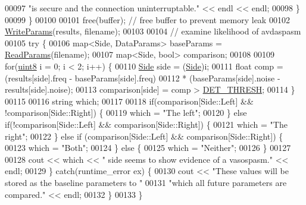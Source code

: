 \begin{DoxyCode}
00097                 \textcolor{stringliteral}{"is secure and the connection uninterruptable."} << endl << endl;
00098         \}
00099     \}
00100 
00101     free(buffer);  \textcolor{comment}{// free buffer to prevent memory leak}
00102     \hyperlink{namespaceavda_aba04a08b41833ced32ec803d55a63bee}{WriteParams}(results, filename);
00103 
00104     \textcolor{comment}{// examine likelihood of avdaspasm}
00105     \textcolor{keywordflow}{try} \{
00106         map<Side, DataParams> baseParams = \hyperlink{namespaceavda_a46dc980b65ddfc24749ce25c1290e158}{ReadParams}(filename);
00107         map<Side, bool> comparison;
00108 
00109         \textcolor{keywordflow}{for}(\hyperlink{definitions_8hpp_adde6aaee8457bee49c2a92621fe22b79}{uint8} i = 0; i < 2; i++) \{
00110             \hyperlink{namespaceavda_af723e82f0d3d45fda6fdc01f6a492786}{Side} side = (\hyperlink{namespaceavda_af723e82f0d3d45fda6fdc01f6a492786}{Side})i;
00111             \textcolor{keywordtype}{float} comp = (results[side].freq - baseParams[side].freq) 
00112                 * (baseParams[side].noise - results[side].noise);
00113             comparison[side] = comp > \hyperlink{definitions_8hpp_aa15adfcc96559f1b86210d217edd3afc}{DET\_THRESH};
00114         \}
00115 
00116         \textcolor{keywordtype}{string} which;
00117 
00118         \textcolor{keywordflow}{if}(comparison[Side::Left] && !comparison[Side::Right]) \{
00119             which = \textcolor{stringliteral}{"The left"};
00120         \} \textcolor{keywordflow}{else} \textcolor{keywordflow}{if}(!comparison[Side::Left] && comparison[Side::Right]) \{
00121             which = \textcolor{stringliteral}{"The right"};
00122         \} \textcolor{keywordflow}{else} \textcolor{keywordflow}{if} (comparison[Side::Left] && comparison[Side::Right]) \{
00123             which = \textcolor{stringliteral}{"Both"};
00124         \} \textcolor{keywordflow}{else} \{
00125             which = \textcolor{stringliteral}{"Neither"};
00126         \}
00127 
00128         cout << which << \textcolor{stringliteral}{" side seems to show evidence of a vasospasm."} << endl;
00129     \} \textcolor{keywordflow}{catch}(runtime\_error ex) \{
00130         cout << \textcolor{stringliteral}{"These values will be stored as the baseline parameters to "}
00131             \textcolor{stringliteral}{"which all future parameters are compared."} << endl;
00132     \}
00133 \}
\end{DoxyCode}
